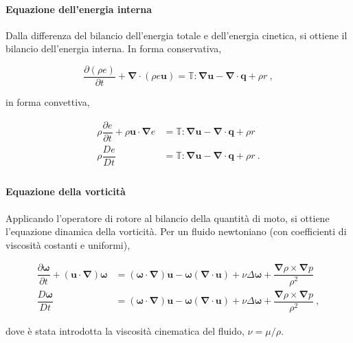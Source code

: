 \paragraph{Equazione dell'energia interna} Dalla differenza del bilancio dell'energia totale e dell'energia cinetica, si ottiene il bilancio dell'energia interna.
In forma conservativa,
\begin{fBox}
\begin{equation}
 \dfrac{\partial (\rho e)}{\partial t} + \bm{\nabla} \cdot (\rho e \bm{u}) = \mathbb{T}:\bm{\nabla}\bm{u} - \bm{\nabla} \cdot \bm{q} + \rho r \ ,
\end{equation}
\end{fBox}
in forma convettiva,
\begin{fBox}
 \begin{equation}
  \begin{aligned}
   \rho \dfrac{\partial e}{\partial t} +  \rho \bm{u}  \cdot \bm{\nabla}e & =  \mathbb{T}:\bm{\nabla}\bm{u} - \bm{\nabla} \cdot \bm{q} + \rho r \\
   \rho \dfrac{D e}{D t} & =  \mathbb{T}:\bm{\nabla}\bm{u} - \bm{\nabla} \cdot \bm{q} + \rho r \ . \\ 
  \end{aligned}
 \end{equation}
\end{fBox}

\paragraph{Equazione della vorticità} Applicando l'operatore di rotore al bilancio della quantità di moto, si ottiene l'equazione dinamica della vorticità. Per un fluido newtoniano (con coefficienti di viscosità costanti e uniformi),
\begin{fBox}
\begin{equation}
\begin{aligned}
 \dfrac{\partial \bm{\omega}}{\partial t} + (\bm{u} \cdot \bm{\nabla} ) \bm{\omega} & =
  (\bm{\omega} \cdot \bm{\nabla}) \bm{u} - \bm{\omega} (\bm{\nabla} \cdot \bm{u}) +
  \nu \Delta \bm{\omega} + \dfrac{\bm{\nabla} \rho \times \bm{\nabla} p}{\rho^2} \\
   \dfrac{D \bm{\omega}}{D t}  & =
  (\bm{\omega} \cdot \bm{\nabla}) \bm{u} - \bm{\omega} (\bm{\nabla} \cdot \bm{u}) +
  \nu \Delta \bm{\omega} + \dfrac{\bm{\nabla} \rho \times \bm{\nabla} p}{\rho^2} \ ,
 \end{aligned}
\end{equation}
\end{fBox}
dove è stata introdotta la viscosità cinematica del fluido, $\nu = \mu / \rho$.

